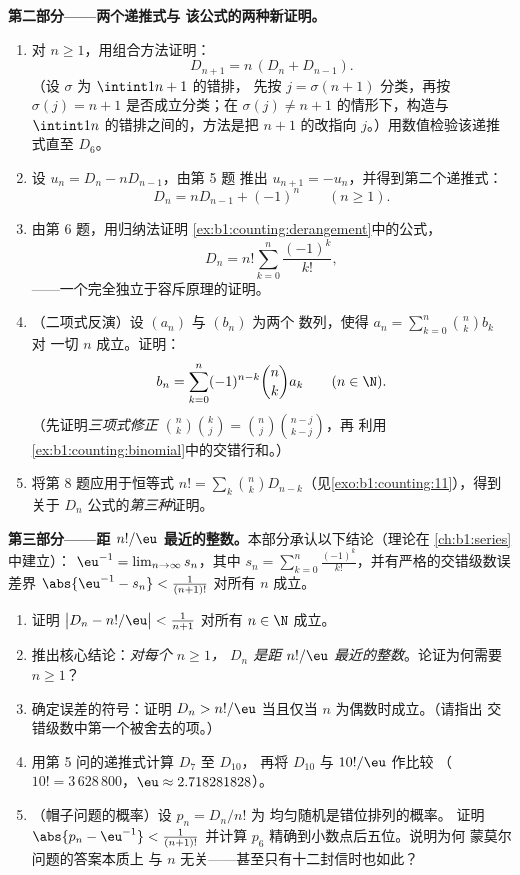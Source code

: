 \begin{problem}
\medskip
\noindent\textbf{第二部分——两个递推式与
该公式的两种新证明。}
\begin{enumerate}[resume]
  \item 对 $n \geq 1$，用组合方法证明：
        \[
        D_{n+1} = n\,(D_n + D_{n-1}) .
        \]
        （设 $\sigma$ 为 $\intint1{n+1}$ 的错排，
        先按 $j = \sigma(n+1)$ 分类，再按 $\sigma(j) = n + 1$ 是否成立分类；在
        $\sigma(j) \neq n+1$ 的情形下，构造与
        $\intint1n$ 的错排之间的，方法是把
        $n + 1$ 的改指向 $j$。）用数值检验该递推式直至
        $D_6$。
  \item 设 $u_n = D_n - n D_{n-1}$，由第 5 题
        推出 $u_{n+1} = -u_n$，并得到第二个递推式：
        \[
        D_n = n D_{n-1} + (-1)^n \qquad (n \geq 1).
        \]
  \item 由第 6 题，用归纳法证明
        \cref{ex:b1:counting:derangement}中的公式，
        \[
        D_n = n! \sum_{k=0}^{n} \frac{(-1)^k}{k!},
        \]
——一个完全独立于容斥原理的证明。
  \item （二项式反演）设 $(a_n)$ 与 $(b_n)$ 为两个
        数列，使得 $a_n = \sum_{k=0}^n \binom nk b_k$ 对
        一切 $n$ 成立。证明：
        \[
        b_n = \sum_{k=0}^{n} (-1)^{n-k} \binom nk a_k
        \qquad (n \in \N).
        \]
        （先证明\emph{三项式修正}
        $\binom nk \binom kj = \binom nj \binom{n-j}{k-j}$，再
        利用
        \cref{ex:b1:counting:binomial}中的交错行和。）
  \item 将第 8 题应用于恒等式 $n! = \sum_k \binom nk
        D_{n-k}$（见\cref{exo:b1:counting:11}），得到
        关于 $D_n$ 公式的\emph{第三种}证明。
\end{enumerate}

\medskip
\noindent\textbf{第三部分——距
$n!/\eu$ 最近的整数。}本部分承认以下结论（理论在
\cref{ch:b1:series}中建立）：
$\eu^{-1} = \lim_{n \to \infty} s_n$，其中 $s_n = \sum_{k=0}^{n}
\frac{(-1)^k}{k!}$，并有严格的交错级数误差界
$\abs{\eu^{-1} - s_n} < \frac1{(n+1)!}$ 对所有 $n$ 成立。
\begin{enumerate}[resume]
  \item 证明 $\bigl| D_n - n!/\eu \bigr| < \frac1{n+1}$
        对所有 $n \in \N$ 成立。
  \item 推出核心结论：\emph{对每个 $n \geq 1$，
        $D_n$ 是距 $n!/\eu$ 最近的整数}。论证为何需要
        $n \geq 1$？
  \item 确定误差的符号：证明 $D_n > n!/\eu$
        当且仅当 $n$ 为偶数时成立。（请指出
        交错级数中第一个被舍去的项。）
  \item 用第 5 问的递推式计算 $D_7$ 至 $D_{10}$，
        再将 $D_{10}$ 与 $10!/\eu$ 作比较
        （$10! = 3\,628\,800$，$\eu \approx 2.718281828$）。
  \item （帽子问题的概率）设 $p_n = D_n/n!$ 为
        均匀随机是错位排列的概率。
        证明 $\abs{p_n - \eu^{-1}} < \frac1{(n+1)!}$
        并计算 $p_6$ 精确到小数点后五位。说明为何
        蒙莫尔问题的答案本质上
        与 $n$ 无关——甚至只有十二封信时也如此？
\end{enumerate}


\end{problem}
